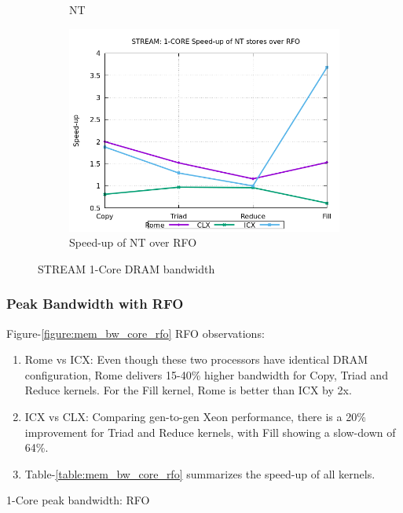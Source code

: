 \documentclass{article}
\begin{document}
\begin{figure}[!ht]
\begin{subfigure}[!ht]{0.3\textwidth}
         \caption{NT}
         \label{figure:mem_bw_core_nt}
    \end{subfigure}
    \begin{subfigure}[!ht]{0.3\textwidth}
         \centering
         \includegraphics[width=\textwidth]{../mem_bw_core/mb_core_nt_rfo}
         \caption{Speed-up of NT over RFO}
         \label{figure:mem_bw_core_nt_rfo}
    \end{subfigure}

    \caption{STREAM 1-Core DRAM bandwidth}
    \label{figure:mem_bw_core}
\end{figure}

\subsubsection{Peak Bandwidth with RFO}
Figure-\ref{figure:mem_bw_core_rfo} RFO observations:
\begin{enumerate}
\item Rome vs ICX: Even though these two processors have identical DRAM configuration, Rome delivers 15-40\% higher bandwidth for Copy, Triad and Reduce kernels. For the Fill kernel, Rome is better than ICX by 2x.
\item ICX vs CLX: Comparing gen-to-gen Xeon performance, there is a 20\% improvement for Triad and Reduce kernels, with Fill showing a slow-down of 64\%.
\item Table-\ref{table:mem_bw_core_rfo} summarizes the speed-up of all kernels.
\end{enumerate}

\begin{table}[h!]
\centering

\caption{1-Core peak bandwidth: RFO}
\label{table:mem_bw_core_rfo}
\end{table}
\end{document}
